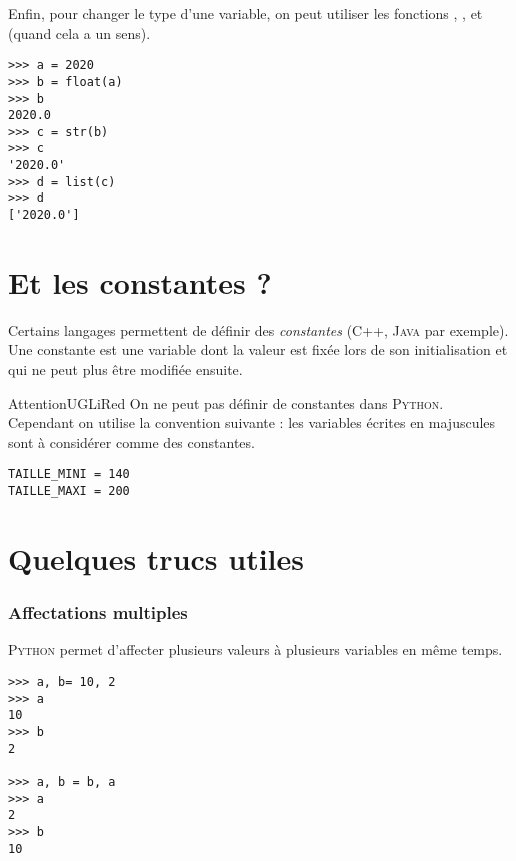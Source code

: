 Enfin, pour changer le type d'une variable, on peut utiliser les fonctions , ,  et  (quand cela a un sens).

\begin{pys}\begin{verbatim}
>>> a = 2020
>>> b = float(a)
>>>	b
2020.0
>>> c = str(b)
>>> c
'2020.0'
>>> d = list(c)
>>> d
['2020.0']
\end{verbatim}
\end{pys}

\section{Et les constantes ?}


Certains langages permettent de définir des \textit{constantes} (\textsc{C++}, \textsc{Java} par exemple). Une constante est \og une variable dont la valeur est fixée lors de son initialisation et qui ne peut plus être modifiée ensuite.

\begin{encadrecolore}{Attention}{UGLiRed}
    On ne peut pas définir de constantes dans \textsc{Python}.\\
    Cependant on utilise la convention suivante : les variables écrites en majuscules sont à considérer comme des constantes.
\end{encadrecolore}

\begin{pyc}\begin{verbatim}
TAILLE_MINI = 140
TAILLE_MAXI = 200
\end{verbatim}
\end{pyc}


\section{Quelques \og trucs \fg{} utiles}

\subsubsection*{Affectations multiples}
\textsc{Python} permet d'affecter plusieurs valeurs à plusieurs variables en même temps.

\begin{pys}\begin{verbatim}
>>> a, b= 10, 2
>>> a
10
>>> b
2

>>> a, b = b, a
>>> a
2
>>> b
10
\end{verbatim}
\end{pys}

